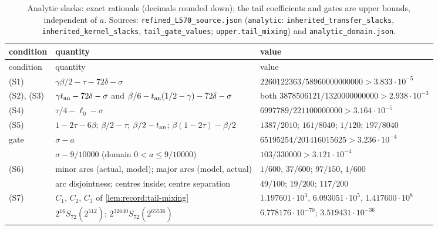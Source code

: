 {\scriptsize\setlength{\tabcolsep}{4pt}\renewcommand{\arraystretch}{0.92}
\begin{longtable}{@{}lll@{}}
\caption{Analytic slacks: exact rationals (decimals rounded down); the tail coefficients and gates are upper bounds, independent of $a$. Sources: \texttt{refined\_L570\_source.json} (\texttt{analytic}: \texttt{inherited\_transfer\_slacks}, \texttt{inherited\_kernel\_slacks}, \texttt{tail\_gate\_values}; \texttt{upper.tail\_mixing}) and \texttt{analytic\_domain.json}.}\label{tab:data:slacks}\\
\toprule
condition & quantity & value\\
\midrule
\endfirsthead
\toprule
condition & quantity & value\\
\midrule
\endhead
\bottomrule
\endfoot
(S1) & $\gamma\beta/2-\tau-72\delta-\sigma$ & $2260122363/58960000000000>3.833\cdot10^{-5}$\\
(S2), (S3) & $\gamma t_{\rm an}-72\delta-\sigma$ and $\beta/6-t_{\rm an}(1/2-\gamma)-72\delta-\sigma$ & both $3878506121/1320000000000>2.938\cdot10^{-3}$\\
(S4) & $\tau/4-\ell_0-\sigma$ & $6997789/221100000000>3.164\cdot10^{-5}$\\
(S5) & $1-2\tau-6\beta$; $\beta/2-\tau$; $\beta/2-t_{\rm an}$; $\beta(1-2\tau)-\beta/2$ & $1387/2010$; $161/8040$; $1/120$; $197/8040$\\
gate & $\sigma-a$ & $65195254/201416015625>3.236\cdot10^{-4}$\\
 & $\sigma-9/10000$ (domain $0<a\le9/10000$) & $103/330000>3.121\cdot10^{-4}$\\
(S6) & minor arcs (actual, model); major arcs (model, actual) & $1/600$, $37/600$; $97/150$, $1/600$\\
 & arc disjointness; centres inside; centre separation & $49/100$; $19/200$; $117/200$\\
(S7) & $C_1$, $C_2$, $C_3$ of \cref{lem:record:tail-mixing} & $1.197601\cdot10^{3}$, $6.093051\cdot10^{5}$, $1.417600\cdot10^{8}$\\
 & $2^{16}S_{72}(2^{512})$; $2^{32640}S_{72}(2^{65536})$ & $6.778176\cdot10^{-70}$; $3.519431\cdot10^{-36}$\\
\end{longtable}
}

